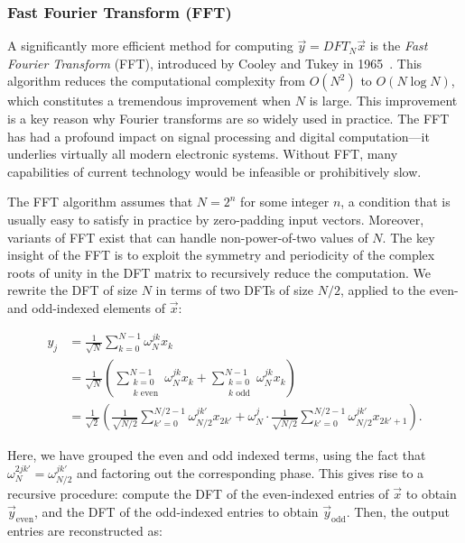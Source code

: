 \subsubsection{Fast Fourier Transform (FFT)}

A significantly more efficient method for computing $\vec{y} = DFT_N \vec{x}$ is the \textit{Fast Fourier Transform} (FFT), introduced by Cooley and Tukey in 1965~\cite{cooley1965algorithm}. This algorithm reduces the computational complexity from $O(N^2)$ to $O(N \log N)$, which constitutes a tremendous improvement when $N$ is large. This improvement is a key reason why Fourier transforms are so widely used in practice. The FFT has had a profound impact on signal processing and digital computation—it underlies virtually all modern electronic systems. Without FFT, many capabilities of current technology would be infeasible or prohibitively slow.

The FFT algorithm assumes that $N = 2^n$ for some integer $n$, a condition that is usually easy to satisfy in practice by zero-padding input vectors. Moreover, variants of FFT exist that can handle non-power-of-two values of $N$. The key insight of the FFT is to exploit the symmetry and periodicity of the complex roots of unity in the DFT matrix to recursively reduce the computation. We rewrite the DFT of size $N$ in terms of two DFTs of size $N/2$, applied to the even- and odd-indexed elements of $\vec{x}$:

\begin{align}
    y_j &= \frac{1}{\sqrt{N}} \sum_{k=0}^{N-1} \omega_N^{jk} x_k \nonumber \\
        &= \frac{1}{\sqrt{N}} \left( \sum_{\substack{k=0 \\ k \text{ even}}}^{N-1} \omega_N^{jk} x_k + \sum_{\substack{k=0 \\ k \text{ odd}}}^{N-1} \omega_N^{jk} x_k \right) \nonumber \\
        &= \frac{1}{\sqrt{2}} \left( \frac{1}{\sqrt{N/2}} \sum_{k'=0}^{N/2 - 1} \omega_{N/2}^{j k'} x_{2k'} + \omega_N^j \cdot \frac{1}{\sqrt{N/2}} \sum_{k'=0}^{N/2 - 1} \omega_{N/2}^{j k'} x_{2k'+1} \right). \label{eq:fft-recursion}
\end{align}

Here, we have grouped the even and odd indexed terms, using the fact that $\omega_N^{2jk'} = \omega_{N/2}^{jk'}$ and factoring out the corresponding phase. This gives rise to a recursive procedure: compute the DFT of the even-indexed entries of $\vec{x}$ to obtain $\vec{y}_{\text{even}}$, and the DFT of the odd-indexed entries to obtain $\vec{y}_{\text{odd}}$. Then, the output entries are reconstructed as:


